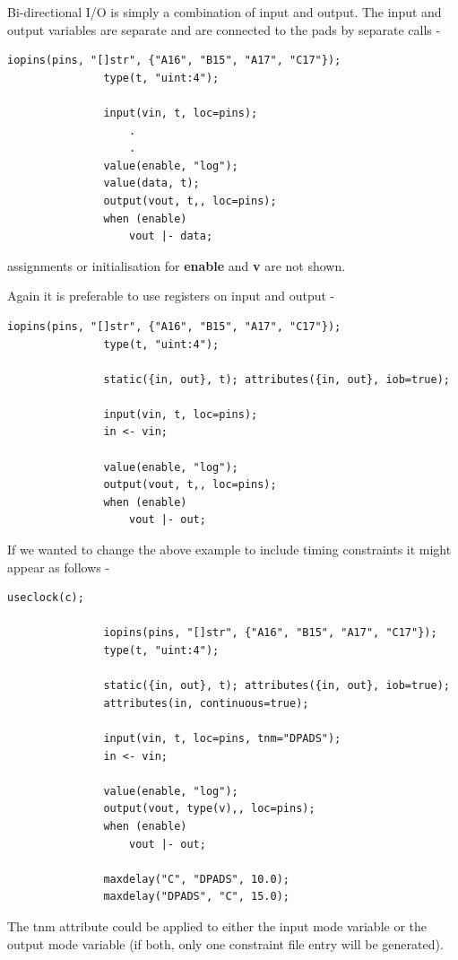             Bi-directional I/O is simply a combination of input and output.
            The input and output variables are separate and are connected
            to the pads by separate calls -
            \begin{lstlisting}[gobble=12, language=threepl]
               iopins(pins, "[]str", {"A16", "B15", "A17", "C17"});
               type(t, "uint:4");

               input(vin, t, loc=pins);
                   .
                   .
               value(enable, "log");
               value(data, t);
               output(vout, t,, loc=pins);
               when (enable)
                   vout |- data;
            \end{lstlisting}
            assignments or initialisation for {\bf enable} and {\bf v} are not shown.
            
            Again it is preferable to use registers on input and output -
            \begin{lstlisting}[gobble=12, language=threepl]
               iopins(pins, "[]str", {"A16", "B15", "A17", "C17"});
               type(t, "uint:4");

               static({in, out}, t); attributes({in, out}, iob=true);

               input(vin, t, loc=pins);
               in <- vin;

               value(enable, "log");
               output(vout, t,, loc=pins);
               when (enable)
                   vout |- out;
            \end{lstlisting}
            If we wanted to change the above example to include timing
            constraints it might appear as follows -
            \begin{lstlisting}[gobble=12, language=threepl]
               useclock(c);

               iopins(pins, "[]str", {"A16", "B15", "A17", "C17"});
               type(t, "uint:4");

               static({in, out}, t); attributes({in, out}, iob=true);
               attributes(in, continuous=true);

               input(vin, t, loc=pins, tnm="DPADS");
               in <- vin;

               value(enable, "log");
               output(vout, type(v),, loc=pins);
               when (enable)
                   vout |- out;

               maxdelay("C", "DPADS", 10.0);
               maxdelay("DPADS", "C", 15.0);
            \end{lstlisting}
            The tnm attribute could be applied to either the input
            mode variable or the output mode variable (if both,
            only one constraint file entry will be generated).

